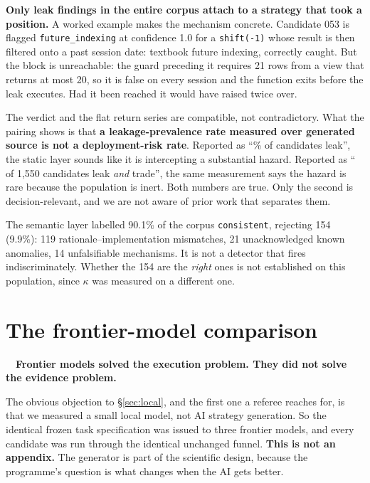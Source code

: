 \documentclass[11pt,a4paper]{article}
\begin{document}
\noindent \textbf{Only \aaLocalStaticRankable{} leak findings in the entire corpus attach to a
strategy that took a position.} A worked example makes the mechanism concrete. Candidate 053 is
flagged \texttt{future\_indexing} at confidence 1.0 for a \texttt{shift(-1)} whose result is then
filtered onto a past session date: textbook future indexing, correctly caught. But the block is
unreachable: the guard preceding it requires 21 rows from a view that returns at most 20, so it is
false on every session and the function exits before the leak executes. Had it been reached it
would have raised twice over.

The verdict and the flat return series are compatible, not contradictory. What the pairing shows
is that \textbf{a leakage-prevalence rate measured over generated source is not a deployment-risk
rate}. Reported as ``\aaLocalStaticPct\% of candidates leak'', the static layer sounds like it is
intercepting a substantial hazard. Reported as ``\aaLocalStaticRankable{} of 1{,}550 candidates
leak \emph{and} trade'', the same measurement says the hazard is rare because the population is
inert. Both numbers are true. Only the second is decision-relevant, and we are not aware of prior
work that separates them.

\medskip
The semantic layer labelled 90.1\% of the corpus \texttt{consistent}, rejecting 154 (9.9\%): 119
rationale--implementation mismatches, 21 unacknowledged known anomalies, 14 unfalsifiable
mechanisms. It is not a detector that fires indiscriminately. Whether the 154 are the \emph{right}
ones is not established on this population, since $\kappa$ was measured on a different one.

\section{The frontier-model comparison}
\label{sec:frontier}

\begin{finding}
\tagfrontier\ \ \textbf{Frontier models solved the execution problem. They did not solve the
evidence problem.}
\end{finding}

The obvious objection to \S\ref{sec:local}, and the first one a referee reaches for, is that
we measured a small local model, not AI strategy generation. So the identical frozen task
specification was issued to three frontier models, and every candidate was run through the
identical unchanged funnel. \textbf{This is not an appendix.} The generator is part of the
scientific design, because the programme's question is what changes when the AI gets better.
\end{document}
